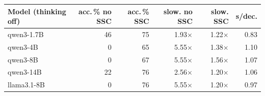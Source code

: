 \begin{tabular}{lrrrrr}
\toprule
Model (thinking off) & acc.\,\% no SSC & acc.\,\% SSC & slow. no SSC & slow. SSC & s/dec. \\
\midrule
qwen3-1.7B & 46 & 75 & 1.93$\times$ & 1.22$\times$ & 0.83 \\
qwen3-4B & 0 & 65 & 5.55$\times$ & 1.38$\times$ & 1.10 \\
qwen3-8B & 0 & 67 & 5.55$\times$ & 1.56$\times$ & 1.07 \\
qwen3-14B & 22 & 76 & 2.56$\times$ & 1.20$\times$ & 1.06 \\
llama3.1-8B & 0 & 76 & 5.55$\times$ & 1.20$\times$ & 0.97 \\
\bottomrule
\end{tabular}
